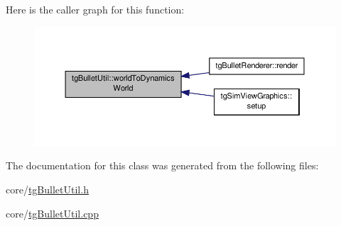 Here is the caller graph for this function\-:\nopagebreak
\begin{figure}[H]
\begin{center}
\leavevmode
\includegraphics[width=350pt]{classtg_bullet_util_a91ab094c3c3cc9ab7402a3618cc75946_icgraph}
\end{center}
\end{figure}




The documentation for this class was generated from the following files\-:\begin{DoxyCompactItemize}
\item 
core/\hyperlink{tg_bullet_util_8h}{tg\-Bullet\-Util.\-h}\item 
core/\hyperlink{tg_bullet_util_8cpp}{tg\-Bullet\-Util.\-cpp}\end{DoxyCompactItemize}
